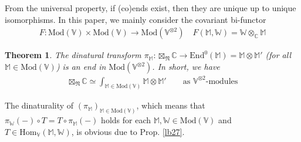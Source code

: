 \documentclass[11pt,b5paper,notitlepage]{article}
\theoremstyle{definition}
\theoremstyle{plain}
\newtheorem{thm}[df]{Theorem}
\newcommand{\End}{\mathrm{End}} %
\newcommand{\Hom}{\mathrm{Hom}}
\newcommand{\Vbb}{\mathbb V}
\newcommand{\Wbb}{\mathbb W}
\newcommand{\Mbb}{\mathbb M}
\newcommand{\Cbb}{\mathbb C}
\newcommand{\<}{\left\langle}
\renewcommand{\>}{\right\rangle}
\newcommand{\Mod}{\mathrm{Mod}}
\newcommand{\fn}{\mathfrak{N}}
\numberwithin{equation}{section}
\begin{document}
From the universal property, if (co)ends exist, then they are unique up to unique isomorphisms. In this paper, we mainly consider the covariant bi-functor 
\begin{align*}
F:\Mod(\Vbb)\times \Mod(\Vbb)\rightarrow \Mod(\Vbb^{\otimes 2})\quad F(\Mbb,\Wbb)=\Wbb\otimes_\Cbb \Mbb
\end{align*}




\begin{thm}\label{end}
The dinatural transform $\pi_\Mbb:\boxtimes_\fn\Cbb\rightarrow \End^0(\Mbb)=\Mbb\otimes\Mbb'$ (for all $\Mbb\in \Mod(\Vbb)$) is an end in $\Mod(\Vbb^{\otimes 2})$. In short, we have 
\begin{align*}
	\boxtimes_\fn\Cbb\simeq \int_{\Mbb\in \Mod(\Vbb)}\Mbb\otimes\Mbb'\qquad\text{as $\Vbb^{\otimes 2}$-modules}
\end{align*} 
\end{thm}

The dinaturality of $(\pi_\Mbb)_{\Mbb\in\Mod(\Vbb)}$, which means that $\pi_\Wbb(-)\circ T=T\circ\pi_\Mbb(-)$ holds for each $\Mbb,\Wbb\in\Mod(\Vbb)$ and $T\in\Hom_\Vbb(\Mbb,\Wbb)$, is obvious due to Prop. \ref{lb27}.
\end{document}
